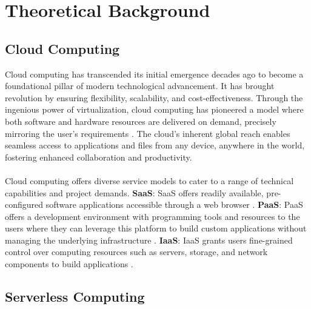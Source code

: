 %
\section{Theoretical Background}\label{sec:theoretical background}
%
\subsection {Cloud Computing}
Cloud computing has transcended its initial emergence decades ago to become a foundational pillar of modern technological advancement. It has brought revolution by ensuring flexibility, scalability, and cost-effectiveness. Through the ingenious power of virtualization, cloud computing has pioneered a model where both software and hardware resources are delivered on demand, precisely mirroring the user's requirements \cite{Chou15}. The cloud's inherent global reach enables seamless access to applications and files from any device, anywhere in the world, fostering enhanced collaboration and productivity\cite{NIST}.\\\\
Cloud computing offers diverse service models to cater to a range of technical capabilities and project demands. 
\textbf {\ac{SaaS}}: SaaS offers readily available, pre-configured software applications accessible through a web browser \cite{Odu18,HBS21}. 
\textbf {\ac{PaaS}}: PaaS offers a development environment with programming tools and resources to the users where they can leverage this platform to build custom applications without managing the underlying infrastructure \cite{Odu18,HBS21}. 
\textbf {\ac{IaaS}}: IaaS grants users fine-grained control over computing resources such as servers, storage, and network components to build applications \cite{Odu18,HBS21}. \\

\subsection {Serverless Computing}

